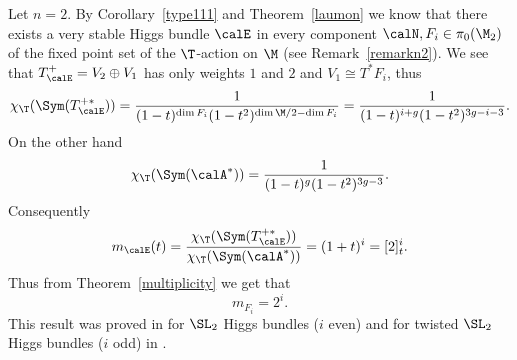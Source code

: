 \begin{remark}
\notready\label{rank2} Let $n=2$. By Corollary~\ref{type111} and Theorem~\ref{laumon} we know that there exists a very stable Higgs bundle $\calE$ in every component $\calN,F_i\in \pi_0(\M_2)$ of the fixed point set of the $\T$-action on $\M$ (see Remark~\ref{remarkn2}).  We see that $T^+_\calE=V_2\oplus V_1$ has only weights $1$ and $2$ and $V_1\cong T^*F_i$, thus $$\chi_\T(\Sym(T^{+*}_\calE))={1\over (1-t)^{\dim F_i}(1-t^2)^{\dim \M/2-\dim F_i}}={1\over(1-t)^{i+g}(1-t^2)^{3g-i-3}}.$$ On the other hand $$\chi_\T(\Sym(\calA^*))={1\over(1-t)^g(1-t^2)^{3g-3}}.$$ Consequently $$m_{\calE}(t)={{ \chi_\T(\Sym(T^{+*}_\calE))\over \chi_\T(\Sym(\calA^*))}}=(1+t)^{i}=[2]_t^i.$$  Thus from Theorem~\ref{multiplicity} we get that $$m_{F_i}=2^i.$$ This result was proved in \cite[Proposition 6]{hitchin1} for $\SL_2$ Higgs bundles ($i$ even) and for twisted $\SL_2$ Higgs bundles ($i$ odd) in \cite{hausel-thaddeus}.	\end{remark}

